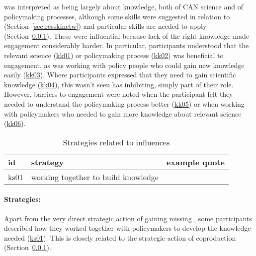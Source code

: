 \skiskil{} was interpreted as being largely about knowledge, both of CAN science and of policymaking processes, although some skills were suggested in relation to \skinetw{} (Section~\ref{sec:resskinetw}) and particular skills are needed to apply \skitech{} (Section~\ref{sec:resskitech}). These were influential because lack of the right knowledge made engagement considerably harder. In particular, participants understood that the relevant science (\hyperref[tab:resskiskil]{kk01}) or policymaking process (\hyperref[tab:resskiskil]{kk02}) was beneficial to engagement, as was working with policy people who could gain new knowledge easily (\hyperref[tab:resskiskil]{kk03}). Where participants expressed that they need to gain scientific knowledge (\hyperref[tab:resskiskil]{kk04}), this wasn't seen has inhibiting, simply part of their role. However, barriers to engagement were noted when the participant felt they needed to understand the policymaking process better (\hyperref[tab:resskiskil]{kk05}) or when working with policymakers who needed to gain more knowledge about relevant science (\hyperref[tab:resskiskil]{kk06}). 

\begin{table}[!ht]
\footnotesize
\caption{Strategies related to \skiskil{} influences}\label{tab:resskiskilstrat}
\begin{tabular}{L{.06\linewidth}L{.3\linewidth}L{.64\linewidth}} \hline
\textbf{id} & \textbf{strategy} & \textbf{example quote} \\ \hline \hline
ks01 & working together to build knowledge &  \\[5mm]
\hline
 \end{tabular}
\end{table}

\paragraph{Strategies:}
Apart from the very direct strategic action of gaining missing \skiskil, some participants described how they worked together with policymakers to develop the knowledge needed (\hyperref[tab:resskiskilstrat]{ks01}). This is closely related to the strategic action of coproduction (Section~\ref{sec:resskitech}).

\subsubsection{\tittech}\label{sec:resskitech}


